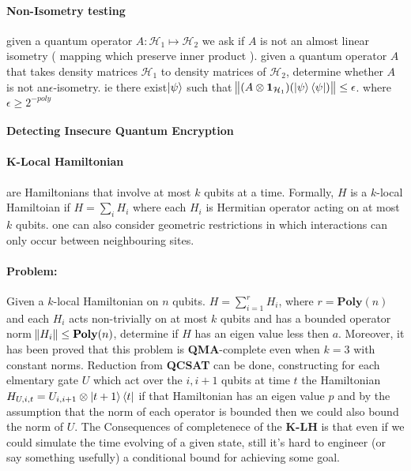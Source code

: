 \paragraph{Non-Isometry testing} given a quantum operator \( A : \mathcal{H}_1 \mapsto \mathcal{H}_2 \) we ask if \(A\) is not an almost linear isometry ( mapping which preserve inner product ). given a quantum operator \( A \) that takes density matrices \( \mathcal{H}_1 \) to density matrices of \(\mathcal{H}_2\), determine whether \(A\) is not an\( \epsilon\)-isometry. ie there exist\( \ket{\psi} \) such that \( \norm{( A \otimes \mathbf{1}_{\mathcal{H}_1 })(\ket{\psi}\bra{\psi} )} \le \epsilon \). where \( \epsilon \ge 2^{-poly} \)  

\paragraph{Detecting Insecure Quantum Encryption} 

\paragraph{K-Local Hamiltonian} are Hamiltonians that involve at most \(k\) qubits at a time. Formally, \(H\) is a \(k\)-local Hamiltoian if \( H = \sum_i{H_i} \) where each \(H_i\) is Hermitian operator acting on at most \(k\) qubits. one can also consider geometric restrictions in which interactions can only occur between neighbouring sites.
\paragraph{Problem:} Given a \(k\)-local Hamiltonian on \(n\) qubits. \(H = \sum_{i=1}^r{H_i}\), where \( r = \mathbf{Poly}(n) \) and each \(H_i\) acts non-trivially on at most \(k\) qubits and has a bounded operator norm \( \norm{H_i} \le \mathbf{Poly}(n) \), determine if \(H\) has an eigen value less then \(a\). Moreover, it has been proved that this problem is \textbf{QMA}-complete even when \(k =3\) with constant norms.
Reduction from \textbf{QCSAT} can be done, constructing for each elmentary gate \(U\) which act over the \(i, i+1\) qubits at time \(t\) the Hamiltonian \(H_{U,i,t} = U_{i,i+1}\otimes\ket{t+1}\bra{t} \) if that Hamiltonian has an eigen value \( p \) and by the assumption that the norm of each operator is bounded then we could also bound the norm of \( U \). The Consequences of completenece of the \textbf{K-LH} is that even if we could simulate the time evolving of a given state, still it's hard to engineer (or say something usefully) a conditional bound for achieving some goal.       
